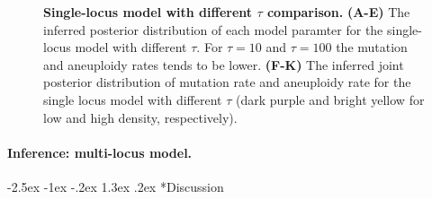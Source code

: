 \documentclass[12pt]{extarticle}
\makeatletter
\renewcommand\section{\@startsection {section}{1}{\z@}%
     {-2.5ex \@plus -1ex \@minus -.2ex}%
     {1.3ex \@plus.2ex}%
    {\Large\bfseries}}
\makeatother
\begin{document}
\begin{figure}[h!]
\begin{subfigure}{0.325\textwidth}
  \end{subfigure}
  \caption{
    \textbf{Single-locus model with different $\tau$ comparison.}  \textbf{(A-E)} The inferred posterior distribution of each model paramter for the single-locus model with different $\tau$. For $\tau=10$ and $\tau=100$ the mutation and aneuploidy rates tends to be lower.  \textbf{(F-K)} The inferred joint posterior distribution of mutation rate and aneuploidy rate for the single locus model with different $\tau$ (dark purple and bright yellow for low and high density, respectively).
  \label{fig:tau}
  }
  \end{figure}


\paragraph{Inference: multi-locus model.}


\pagebreak
\section*{Discussion}
\end{document}
